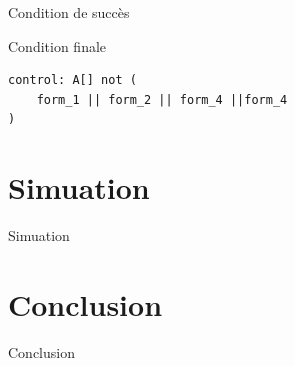 \documentclass{bredelebeamer}
\begin{document}
\begin{frame}[fragile]{Condition de succès}
\begin{block}{Condition finale}
\begin{verbatim}
control: A[] not (
    form_1 || form_2 || form_4 ||form_4
)
\end{verbatim}
\end{block}
\end{frame} 

\section{Simuation}
\begin{frame}{Simuation}

\end{frame}

\section{Conclusion}
\begin{frame}{Conclusion}

\end{frame}
\end{document}
